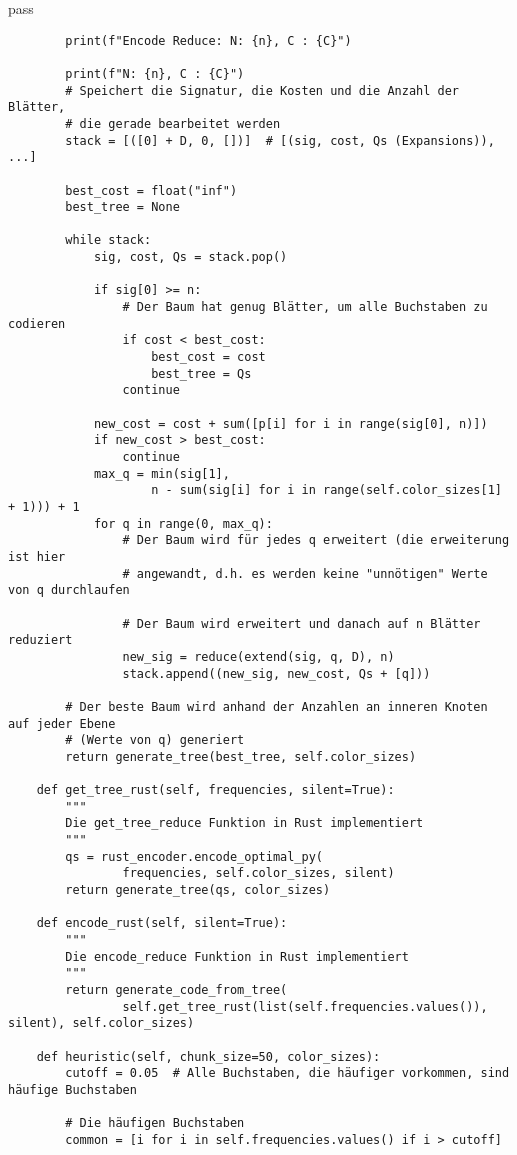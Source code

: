 pass\documentclass[a4paper,10pt,ngerman]{scrartcl}
\begin{document}
\begin{verbatim}
        print(f"Encode Reduce: N: {n}, C : {C}")

        print(f"N: {n}, C : {C}")
        # Speichert die Signatur, die Kosten und die Anzahl der Blätter,
        # die gerade bearbeitet werden
        stack = [([0] + D, 0, [])]  # [(sig, cost, Qs (Expansions)), ...]

        best_cost = float("inf")
        best_tree = None

        while stack:
            sig, cost, Qs = stack.pop()

            if sig[0] >= n:
                # Der Baum hat genug Blätter, um alle Buchstaben zu codieren
                if cost < best_cost:
                    best_cost = cost
                    best_tree = Qs
                continue

            new_cost = cost + sum([p[i] for i in range(sig[0], n)])
            if new_cost > best_cost:
                continue
            max_q = min(sig[1],
                    n - sum(sig[i] for i in range(self.color_sizes[1] + 1))) + 1
            for q in range(0, max_q):
                # Der Baum wird für jedes q erweitert (die erweiterung ist hier
                # angewandt, d.h. es werden keine "unnötigen" Werte von q durchlaufen

                # Der Baum wird erweitert und danach auf n Blätter reduziert
                new_sig = reduce(extend(sig, q, D), n)
                stack.append((new_sig, new_cost, Qs + [q]))

        # Der beste Baum wird anhand der Anzahlen an inneren Knoten auf jeder Ebene
        # (Werte von q) generiert
        return generate_tree(best_tree, self.color_sizes)

    def get_tree_rust(self, frequencies, silent=True):
        """
        Die get_tree_reduce Funktion in Rust implementiert
        """
        qs = rust_encoder.encode_optimal_py(
                frequencies, self.color_sizes, silent)
        return generate_tree(qs, color_sizes)

    def encode_rust(self, silent=True):
        """
        Die encode_reduce Funktion in Rust implementiert
        """
        return generate_code_from_tree(
                self.get_tree_rust(list(self.frequencies.values()), silent), self.color_sizes)

    def heuristic(self, chunk_size=50, color_sizes):
        cutoff = 0.05  # Alle Buchstaben, die häufiger vorkommen, sind häufige Buchstaben

        # Die häufigen Buchstaben
        common = [i for i in self.frequencies.values() if i > cutoff]


\end{verbatim}
\end{document}
